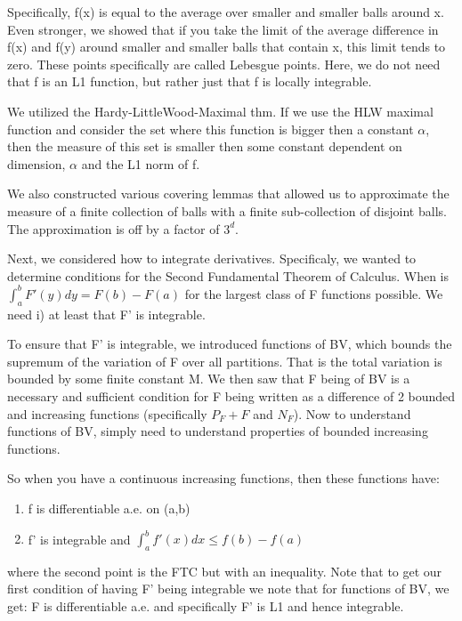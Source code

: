 \documentclass[class=article, crop=false]{standalone}
\begin{document}
		Specifically, f(x) is equal to the average over smaller and smaller balls around x. Even stronger, we showed that if you take the limit of the average difference in f(x) and f(y) around smaller and smaller balls that contain x, this limit tends to zero. These points specifically are called Lebesgue points. Here, we do not need that f is an L1 function, but rather just that f is locally integrable.

		We utilized the Hardy-LittleWood-Maximal thm. If we use the HLW maximal function and consider the set where this function is bigger then a constant $\alpha$, then the measure of this set is smaller then some constant dependent on dimension, $\alpha$ and the L1 norm of f.

		We also constructed various covering lemmas that allowed us to approximate the measure of a finite collection of balls with a finite sub-collection of disjoint balls. The approximation is off by a factor of $3^d$. 

		Next, we considered how to integrate derivatives. Specificaly, we wanted to determine conditions for the Second Fundamental Theorem of Calculus. When is $\int_a^b F'(y) dy = F(b) - F(a)$ for the largest class of F functions possible. We need i) at least that F' is integrable.

		To ensure that F' is integrable, we introduced functions of BV, which bounds the supremum of the variation of F over all partitions. That is the total variation is bounded by some finite constant M. We then saw that F being of BV is a necessary and sufficient condition for F being written as a difference of 2 bounded and increasing functions (specifically $P_F + F$ and $N_F$). Now to understand functions of BV, simply need to understand properties of bounded increasing functions.

		So when you have a continuous increasing functions, then these functions have:

		\begin{enumerate}
			\item f is differentiable a.e. on (a,b)
			\item f' is integrable and $\int_a^b f'(x) dx \le f(b) - f(a)$
		\end{enumerate}

		where the second point is the FTC but with an inequality. Note that to get our first condition of having F' being integrable we note that for functions of BV, we get: F is differentiable a.e. and specifically F' is L1 and hence integrable. 
\end{document}
